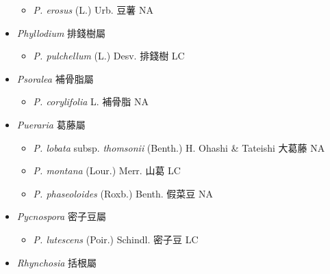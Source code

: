 \begin{itemize}
  \begin{itemize}
        \item[] \textit{P. erosus} (L.) Urb.  豆薯   NA
  \end{itemize}
 \item[] \textit{Phyllodium} 排錢樹屬
                                
  \begin{itemize}
        \item[] \textit{P. pulchellum} (L.) Desv.  排錢樹   LC
  \end{itemize}
 \item[] \textit{Psoralea} 補骨脂屬
                                
  \begin{itemize}
        \item[] \textit{P. corylifolia} L.  補骨脂   NA
  \end{itemize}
 \item[] \textit{Pueraria} 葛藤屬
                                
  \begin{itemize}
        \item[] \textit{P. lobata} subsp. \textit{thomsonii} (Benth.) H. Ohashi \& Tateishi  大葛藤   NA
        \item[] \textit{P. montana} (Lour.) Merr.  山葛   LC
        \item[] \textit{P. phaseoloides} (Roxb.) Benth.  假菜豆   NA
  \end{itemize}
 \item[] \textit{Pycnospora} 密子豆屬
                                
  \begin{itemize}
        \item[] \textit{P. lutescens} (Poir.) Schindl.  密子豆   LC
  \end{itemize}
 \item[] \textit{Rhynchosia} 括根屬
                                

\end{itemize}
